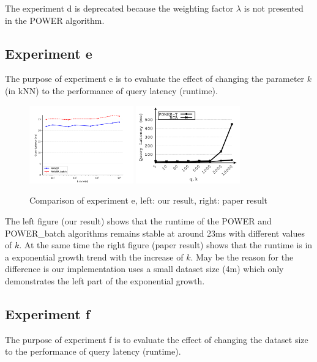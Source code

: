 \documentclass[]{IEEEphot}
\begin{document}
The experiment d is deprecated because the weighting factor $\lambda$ is not presented in the POWER algorithm.

\subsection{Experiment e}

The purpose of experiment e is to evaluate the effect of changing the parameter $k$ (in kNN) to the performance of query latency (runtime).

\begin{figure}[h]
    \centering
    \includegraphics[width=0.4\textwidth]{../exp_plots/e_4m_50queries_20250314-214212.png}
    \includegraphics[width=0.4\textwidth]{./pics/paper-exp-e.png}
    \caption{Comparison of experiment e, left: our result, right: paper result}
\end{figure}

The left figure (our result) shows that the runtime of the POWER and POWER\_batch algorithms remains stable at around 23ms with different values of $k$. At the same time the right figure (paper result) shows that the runtime is in a exponential growth trend with the increase of $k$. May be the reason for the difference is our implementation uses a small dataset size (4m) which only demonstrates the left part of the exponential growth.

\subsection{Experiment f}

The purpose of experiment f is to evaluate the effect of changing the dataset size to the performance of query latency (runtime).
\end{document}
